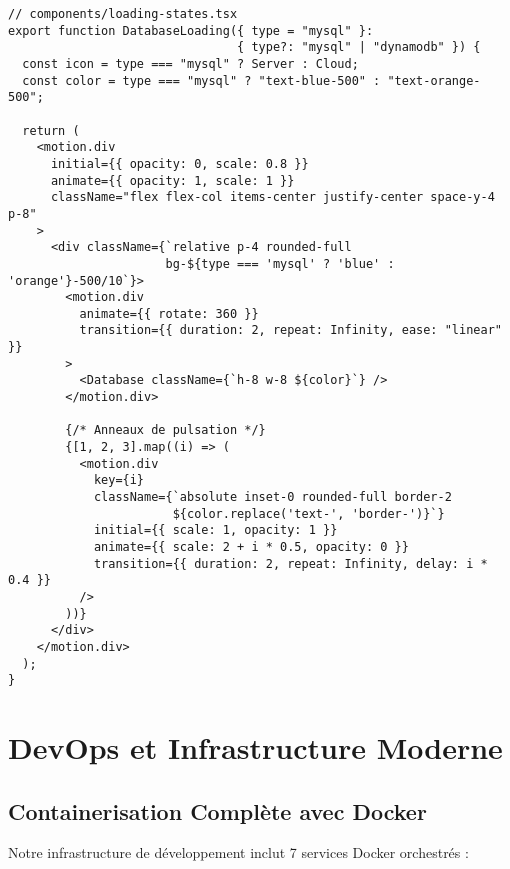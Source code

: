 \documentclass[12pt,a4paper]{report}
\begin{document}
\begin{lstlisting}[caption=États de chargement avec animations]
// components/loading-states.tsx
export function DatabaseLoading({ type = "mysql" }: 
                                { type?: "mysql" | "dynamodb" }) {
  const icon = type === "mysql" ? Server : Cloud;
  const color = type === "mysql" ? "text-blue-500" : "text-orange-500";

  return (
    <motion.div
      initial={{ opacity: 0, scale: 0.8 }}
      animate={{ opacity: 1, scale: 1 }}
      className="flex flex-col items-center justify-center space-y-4 p-8"
    >
      <div className={`relative p-4 rounded-full 
                      bg-${type === 'mysql' ? 'blue' : 'orange'}-500/10`}>
        <motion.div
          animate={{ rotate: 360 }}
          transition={{ duration: 2, repeat: Infinity, ease: "linear" }}
        >
          <Database className={`h-8 w-8 ${color}`} />
        </motion.div>
        
        {/* Anneaux de pulsation */}
        {[1, 2, 3].map((i) => (
          <motion.div
            key={i}
            className={`absolute inset-0 rounded-full border-2 
                       ${color.replace('text-', 'border-')}`}
            initial={{ scale: 1, opacity: 1 }}
            animate={{ scale: 2 + i * 0.5, opacity: 0 }}
            transition={{ duration: 2, repeat: Infinity, delay: i * 0.4 }}
          />
        ))}
      </div>
    </motion.div>
  );
}
\end{lstlisting}

\chapter{DevOps et Infrastructure Moderne}

\section{Containerisation Complète avec Docker}

Notre infrastructure de développement inclut 7 services Docker orchestrés :
\end{document}
